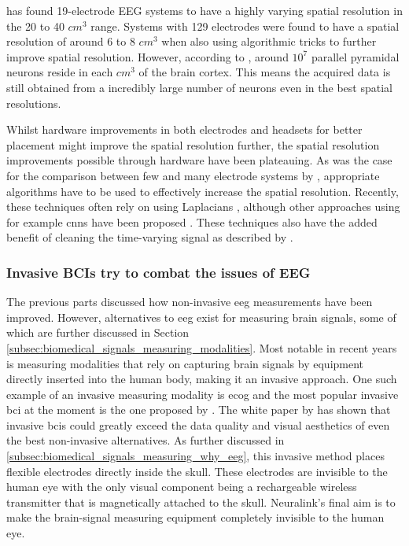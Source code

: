  has found 19-electrode EEG systems to have a highly varying spatial resolution in the 20 to 40 $cm^3$ range.
Systems with 129 electrodes were found to have a spatial resolution of around 6 to 8 $cm^3$ \citep{spatial_resolution} when also using algorithmic tricks to further improve spatial resolution.
However, according to \citet{neurons_book}, around $10^7$ parallel pyramidal neurons reside in each $cm^3$ of the brain cortex.
This means the acquired data is still obtained from a incredibly large number of neurons even in the best spatial resolutions.

Whilst hardware improvements in both electrodes and headsets for better placement might improve the spatial resolution further, the spatial resolution improvements possible through hardware have been plateauing.
As was the case for the comparison between few and many electrode systems by \citet{spatial_resolution}, appropriate algorithms have to be used to effectively increase the spatial resolution.
Recently, these techniques often rely on using Laplacians \citep{improve_eeg_spatial_laplacian1, improve_eeg_spatial_laplacian2, improve_eeg_spatial_laplacian3}, although other approaches using for example \glspl{cnn} have been proposed \citep{improve_eeg_spatial_cnn}.
These techniques also have the added benefit of cleaning the time-varying signal as described by \citet{improve_eeg_spatial_comparison}.


\subsubsection{Invasive BCIs try to combat the issues of EEG}
\label{subsubsec:bci_gaining_popularity_better_measuring_invasive}

The previous parts discussed how non-invasive \gls{eeg} measurements have been improved.
However, alternatives to \gls{eeg} exist for measuring brain signals, some of which are further discussed in Section \ref{subsec:biomedical_signals_measuring_modalities}.
Most notable in recent years is measuring modalities that rely on capturing brain signals by equipment directly inserted into the human body, making it an invasive approach.
One such example of an invasive measuring modality is \gls{ecog} and the most popular invasive \gls{bci} at the moment is the one proposed by \citet{neuralink_whitepaper}.
The white paper by \citet{neuralink_whitepaper} has shown that invasive \glspl{bci} could greatly exceed the data quality and visual aesthetics of even the best non-invasive alternatives.
As further discussed in \ref{subsec:biomedical_signals_measuring_why_eeg}, this invasive method places flexible electrodes directly inside the skull.
These electrodes are invisible to the human eye with the only visual component being a rechargeable wireless transmitter that is magnetically attached to the skull.
Neuralink's final aim is to make the brain-signal measuring equipment completely invisible to the human eye.

